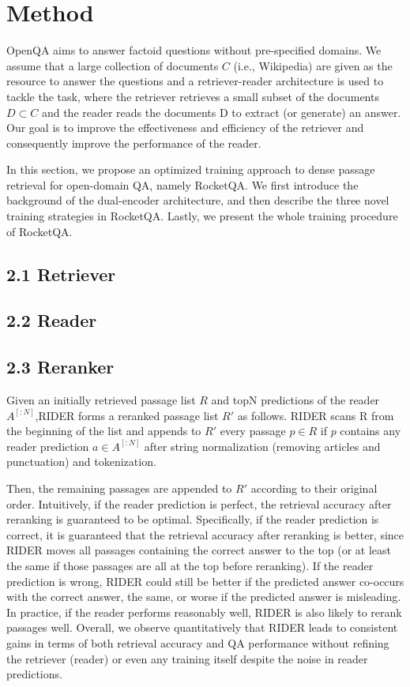 \section{Method}
OpenQA aims to answer factoid questions without pre-specified domains. We assume that a large collection of documents $C$ (i.e., Wikipedia) are given as the resource to answer the questions and a retriever-reader architecture is used to tackle the task, where the retriever retrieves a small subset of the documents $D \subset C$ and the reader reads the documents D to extract (or generate) an answer. Our goal is to improve the effectiveness and efficiency of the retriever and consequently improve the performance of the reader.

In this section, we propose an optimized training approach to dense passage retrieval for open-domain QA, namely RocketQA. We first introduce the background of the dual-encoder architecture, and then describe the three novel training strategies in RocketQA. Lastly, we present the whole training procedure of RocketQA.
\subsection*{2.1 Retriever}

\subsection*{2.2 Reader}

\subsection*{2.3 Reranker}

Given an initially retrieved passage list $R$ and topN predictions of the reader $A^{[:N]}$,RIDER forms a reranked passage list $R'$ as follows. RIDER scans R from the beginning of the list and appends to $R'$ every passage  $p \in R$ if $p$ contains any reader prediction $a\in A^{[:N]}$ after string normalization (removing articles and punctuation) and tokenization.

Then, the remaining passages are appended to $R'$ according to their original order. Intuitively, if the reader prediction is perfect, the retrieval accuracy after reranking is guaranteed to be optimal. Specifically, if the reader prediction is correct, it is guaranteed that the retrieval accuracy after reranking is better, since RIDER moves all passages containing the correct answer to the top (or at least the same if those passages are all at the top before reranking). If the reader prediction is wrong, RIDER could still be better if the predicted answer co-occurs with the correct answer, the same, or worse if the predicted answer is misleading. In practice, if the reader performs reasonably well, RIDER is also likely to rerank passages well. Overall, we observe quantitatively that RIDER leads to consistent gains in terms of both retrieval accuracy and QA performance without refining the retriever (reader) or even any training itself despite the noise in reader predictions.